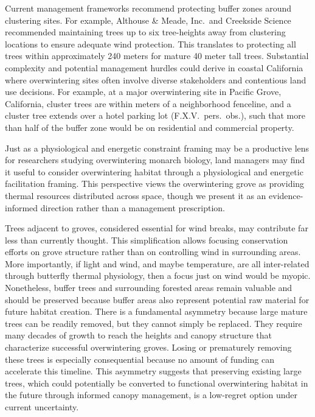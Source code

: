 \documentclass[insects,article,submit,pdftex,moreauthors]{Definitions/mdpi}
\begin{document}
Current management frameworks recommend protecting buffer zones around clustering sites. For example, Althouse \& Meade, Inc.\ and Creekside Science \cite{althouse&meadeinc.EllwoodMesaSperling2023} recommended maintaining trees up to six tree-heights away from clustering locations to ensure adequate wind protection. This translates to protecting all trees within approximately 240 meters for mature 40 meter tall trees. Substantial complexity and potential management hurdles could derive in coastal California where overwintering sites often involve diverse stakeholders and contentious land use decisions. For example, at a major overwintering site in Pacific Grove, California, cluster trees are within meters of a neighborhood fenceline, and a cluster tree extends over a hotel parking lot (F.X.V.\ pers.\ obs.), such that more than half of the buffer zone would be on residential and commercial property.

Just as a physiological and energetic constraint framing may be a productive lens for researchers studying overwintering monarch biology, land managers may find it useful to consider overwintering habitat through a physiological and energetic facilitation framing. This perspective views the overwintering grove as providing thermal resources distributed across space, though we present it as an evidence-informed direction rather than a management prescription.

Trees adjacent to groves, considered essential for wind breaks, may contribute far less than currently thought. This simplification allows focusing conservation efforts on grove structure rather than on controlling wind in surrounding areas. More importantly, if light and wind, and maybe temperature, are all inter-related through butterfly thermal physiology, then a focus just on wind would be myopic. Nonetheless, buffer trees and surrounding forested areas remain valuable and should be preserved because buffer areas also represent potential raw material for future habitat creation. There is a fundamental asymmetry because large mature trees can be readily removed, but they cannot simply be replaced. They require many decades of growth to reach the heights and canopy structure that characterize successful overwintering groves. Losing or prematurely removing these trees is especially consequential because no amount of funding can accelerate this timeline. This asymmetry suggests that preserving existing large trees, which could potentially be converted to functional overwintering habitat in the future through informed canopy management, is a low-regret option under current uncertainty.
\end{document}
